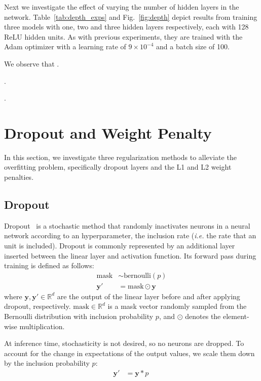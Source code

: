 \documentclass{article}
\begin{document}
\questionTableTwo
\questionFigureThree

Next we investigate the effect of varying the number of hidden layers in the network. 
Table~\ref{tab:depth_exps} and Fig.~\ref{fig:depth} depict results from training three models with one, two and three hidden layers respectively, each with 128 ReLU hidden units. 
As with previous experiments, they are trained with the Adam optimizer with a learning rate of $9 \times 10^{-4}$ and a batch size of 100. 

We observe that \questionTen.

\questionEleven.

\questionTwelve.


\section{Dropout and Weight Penalty}
\label{sec:task2.1} 

In this section, we investigate three regularization methods to alleviate the overfitting problem, specifically dropout layers and the L1 and L2 weight penalties.


\subsection{Dropout}

Dropout~\cite{srivastava2014dropout} is a stochastic method that randomly inactivates neurons in a neural network according to an hyperparameter, the inclusion rate  (\textit{i.e.} the rate that an unit is included).
Dropout is commonly represented by an additional layer inserted between the linear layer and activation function.
Its forward pass during training is defined as follows:
\begin{align}
    \text{mask} &\sim \text{bernoulli}(p)\\
    \bm{y}' &= \text{mask} \odot \bm{y}\
\end{align}
where $\bm{y}, \bm{y}' \in \mathbb{R}^d$ are the output of the linear layer before and after applying dropout, respectively. 
$\text{mask} \in \mathbb{R}^d$ is a mask vector randomly sampled from the Bernoulli distribution with inclusion probability $p$, and $\odot$ denotes the element-wise multiplication.

At inference time, stochasticity is not desired, so no neurons are dropped. 
To account for the change in expectations of the output values, we scale them down by the inclusion probability $p$:
\begin{align}
    \bm{y}' &= \bm{y}*p\
\end{align}
\end{document}
